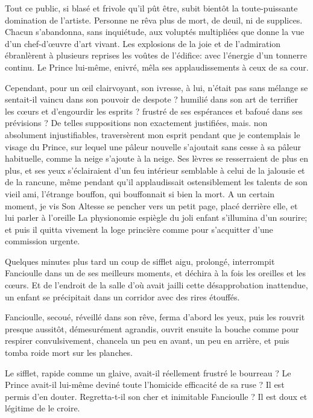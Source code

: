 Tout ce public, si blasé et frivole qu’il pût être,
subit bientôt la toute{}-puissante domination de
l’artiste. Personne ne rêva plus de mort, de deuil, ni
de supplices. Chacun s’abandonna, sans inquiétude, aux
voluptés multipliées que donne la vue d’un
chef{}-d’\oe uvre d’art vivant. Les
explosions de la joie et de l’admiration ébranlèrent à
plusieurs reprises les voûtes de l’édifice: avec
l’énergie d’un tonnerre continu. Le
Prince lui{}-même, enivré, mêla ses applaudissements à ceux de sa cour.

Cependant, pour un \oe il clairvoyant, son ivresse, à lui,
n’était pas sans mélange se sentait{}-il vaincu dans
son pouvoir de despote ? humilié dans son art de terrifier les c\oe urs
et d’engourdir les esprits ? frustré de ses espérances
et bafoué dans ses prévisions ? De telles suppositions non exactement
justifiées, mais. non absolument injustifiables, traversèrent mon
esprit pendant que je contemplais le visage du Prince, sur lequel une
pâleur nouvelle s’ajoutait sans cesse à sa pâleur
habituelle, comme la neige s’ajoute à la neige. Ses
lèvres se resserraient de plus en plus, et ses yeux
s’éclairaient d’un feu intérieur
semblable à celui de la jalousie et de la rancune, même pendant
qu’il applaudissait ostensiblement les talents de son
vieil ami, l’étrange bouffon, qui bouffonnait si bien
la mort. A un certain moment, je vis Son Altesse se pencher vers un
petit page, placé derrière elle, et lui parler à
l’oreille La physionomie espiègle du joli enfant
s’illumina d’un sourire; et puis il
quitta vivement la loge princière comme pour
s’acquitter d’une commission urgente.

Quelques minutes plus tard un coup de sifflet aigu, prolongé,
interrompit Fancioulle dans un de ses meilleurs moments, et déchira à
la fois les oreilles et les c\oe urs. Et de l’endroit de
la salle d’où avait jailli cette désapprobation
inattendue, un enfant se précipitait dans un corridor avec des rires
étouffés.

Fancioulle, secoué, réveillé dans son rêve, ferma
d’abord les yeux, puis les rouvrit presque aussitôt,
démesurément agrandis, ouvrit ensuite la bouche comme pour respirer
convulsivement, chancela un peu en avant, un peu en arrière, et puis
tomba roide mort sur les planches.

Le sifflet, rapide comme un glaive, avait{}-il réellement frustré le
bourreau ? Le Prince avait{}-il lui{}-même deviné toute
l’homicide efficacité de sa ruse ? Il est permis
d’en douter. Regretta{}-t{}-il son cher et inimitable
Fancioulle ? Il est doux et légitime de le croire.


